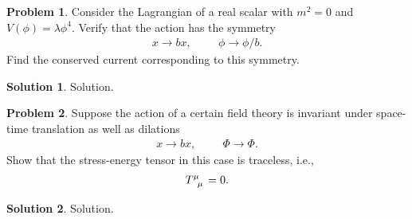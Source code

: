 \documentclass[a4paper,11pt]{article}
\numberwithin{equation}{section}
\theoremstyle{definition}
\newtheorem{prob}{Problem}[section]
\newtheorem{sln}{Solution}[section]
\begin{document}
\begin{prob}
	Consider the Lagrangian of a real scalar with $m^2 = 0$ and $V(\phi) = \lambda \phi^4$. Verify that the action has the symmetry
	\begin{align}
	x\to bx, \hspace{1cm} \phi \to \phi/b. 
	\end{align}
	Find the conserved current corresponding to this symmetry.\\
	
	\begin{sln}
		Solution.
	\end{sln}
\end{prob}










\newpage



\begin{prob}
	Suppose the action of a certain field theory is invariant under space-time translation as well as dilations
	\begin{align}
	x\to bx,\hspace{1cm} \Phi \to \Phi.
	\end{align}
	Show that the stress-energy tensor in this case is traceless, i.e.,
	\begin{align}
	\tensor{T}{^\mu_\mu} = 0.
	\end{align}
	
	\begin{sln}
		Solution.
	\end{sln}
\end{prob}
\end{document}
